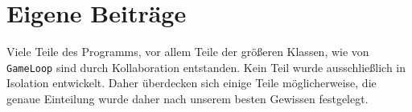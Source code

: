 \section{Eigene Beiträge}

Viele Teile des Programms, vor allem Teile der größeren Klassen, wie von \texttt{GameLoop} sind durch Kollaboration entstanden.
Kein Teil wurde ausschließlich in Isolation entwickelt.
Daher überdecken sich einige Teile möglicherweise, die genaue Einteilung wurde daher nach unserem besten Gewissen festgelegt.








